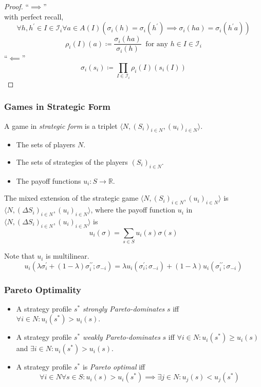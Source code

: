 \documentclass[UTF8,11pt,colorlinks,compress,openany]{beamer}%
\begin{document}
\begin{frame}\frametitle{}
\begin{proof}
	``$\implies$''\\
	with perfect recall,
	\[\forall h,h^\prime\in I\in\mathcal{I}_i\forall a\in A(I)\left(\sigma_i(h)=\sigma_i(h^\prime)\implies\sigma_i(ha)=\sigma_i(h^\prime a)\right)\]
	\[\rho_i(I)(a)\coloneqq \dfrac{\sigma_i(ha)}{\sigma_i(h)}\;\;\text{for any $h\in I\in\mathcal{I}_i$}\]
	``$\impliedby$''
	\[\sigma_i(s_i)\coloneqq \prod\limits_{I\in\mathcal{I}_i}\rho_i(I)(s_i(I))\]
\end{proof}
\end{frame}

\begin{frame}\frametitle{Games in Strategic Form}
\begin{definition}
	A game in \emph{strategic form} is a triplet $\langle N,(S_i)_{i\in N},(u_i)_{i\in N}\rangle$.
	\begin{itemize}
		\item The sets of players $N$.
		\item The sets of strategies of the players $(S_i)_{i\in N}$.
		\item The payoff functions $u_i: S\to\mathbb R$.
	\end{itemize}
\end{definition}
\begin{definition}
	The mixed extension of the strategic game $\langle N,(S_i)_{i\in N},(u_i)_{i\in N}\rangle$ is $\langle N,(\Delta S_i)_{i\in N},(u_i)_{i\in N}\rangle$, where the payoff function $u_i$ in $\langle N,(\Delta S_i)_{i\in N},(u_i)_{i\in N}\rangle$ is \[u_i(\sigma)=\sum\limits_{s\in S}u_i(s)\sigma(s)\]
\end{definition}
Note that $u_i$ is multilinear.
\[u_i(\lambda\sigma_i^\prime+(1-\lambda)\sigma_i^{\prime\prime};\sigma_{-i})=\lambda u_i(\sigma_i^\prime;\sigma_{-i})+(1-\lambda)u_i(\sigma_i^{\prime\prime};\sigma_{-i})\]
\end{frame}

\begin{frame}\frametitle{Pareto Optimality}
\begin{itemize}
	\item A strategy profile $s^*$ \emph{strongly Pareto-dominates} $s$ iff $\forall i\in N: u_i(s^*)>u_i(s)$.
	\item A strategy profile $s^*$ \emph{weakly Pareto-dominates} $s$ iff $\forall i\in N: u_i(s^*)\geq u_i(s)$ and $\exists i\in N: u_i(s^*)>u_i(s)$.
	\item A strategy profile $s^*$ is \emph{Pareto optimal} iff
	\[\forall i\in N\forall s\in S: u_i(s)>u_i(s^*)\implies\exists j\in N: u_j(s)<u_j(s^*)\]
\end{itemize}
\end{frame}
\end{document}
